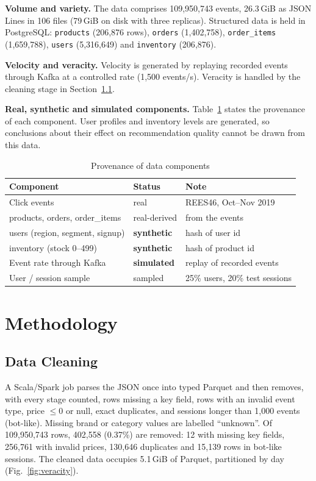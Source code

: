 \documentclass[10pt,journal]{IEEEtran}
\begin{document}
\textbf{Volume and variety.} The data comprises 109{,}950{,}743 events, 26.3\,GiB as JSON Lines in 106 files (79\,GiB on disk with three replicas). Structured data is held in PostgreSQL: \texttt{products} (206{,}876 rows), \texttt{orders} (1{,}402{,}758), \texttt{order\_items} (1{,}659{,}788), \texttt{users} (5{,}316{,}649) and \texttt{inventory} (206{,}876).

\textbf{Velocity and veracity.} Velocity is generated by replaying recorded events through Kafka at a controlled rate (1{,}500 events/s). Veracity is handled by the cleaning stage in Section~\ref{sec:clean}.

\textbf{Real, synthetic and simulated components.} Table~\ref{tab:real} states the provenance of each component. User profiles and inventory levels are generated, so conclusions about their effect on recommendation quality cannot be drawn from this data.

\begin{table}[!t]
\caption{Provenance of data components}
\label{tab:real}
\centering
\footnotesize
\begin{tabular}{@{}lll@{}}
\hline
\textbf{Component} & \textbf{Status} & \textbf{Note}\\\hline
Click events & real & REES46, Oct--Nov 2019\\
products, orders, order\_items & real-derived & from the events\\
users (region, segment, signup) & \textbf{synthetic} & hash of user id\\
inventory (stock 0--499) & \textbf{synthetic} & hash of product id\\
Event rate through Kafka & \textbf{simulated} & replay of recorded events\\
User / session sample & sampled & 25\% users, 20\% test sessions\\\hline
\end{tabular}
\end{table}

\section{Methodology}
\subsection{Data Cleaning}\label{sec:clean}
A Scala/Spark job parses the JSON once into typed Parquet and then removes, with every stage counted, rows missing a key field, rows with an invalid event type, price $\le 0$ or null, exact duplicates, and sessions longer than 1{,}000 events (bot-like). Missing brand or category values are labelled ``unknown''. Of 109{,}950{,}743 rows, 402{,}558 (0.37\%) are removed: 12 with missing key fields, 256{,}761 with invalid prices, 130{,}646 duplicates and 15{,}139 rows in bot-like sessions. The cleaned data occupies 5.1\,GiB of Parquet, partitioned by day (Fig.~\ref{fig:veracity}).
\end{document}
